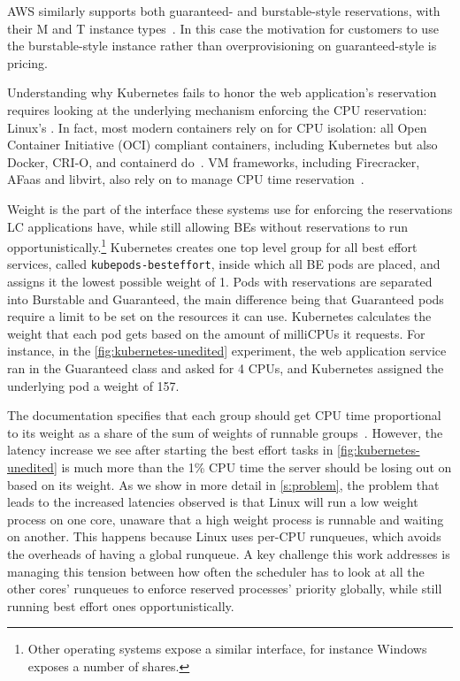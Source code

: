 AWS similarly supports both guaranteed- and burstable-style reservations, with
their M and T instance types~\cite{aws-ec2-burstable,aws-ec2-resources}. In this
case the motivation for customers to use the burstable-style instance rather
than overprovisioning on guaranteed-style is pricing.




Understanding why Kubernetes fails to honor the web application's reservation
requires looking at the underlying mechanism enforcing the CPU reservation:
Linux's \cgroups{}. In fact, most modern containers rely on \cgroups{} for CPU
isolation: all Open Container Initiative (OCI) compliant containers, including
Kubernetes but also Docker, CRI-O, and containerd
do~\cite{oci-cgroups,docker-docs-cgroups,container-isolation-article}. VM
frameworks, including Firecracker, AFaas and libvirt, also rely on \cgroups{} to
manage CPU time reservation~\cite{firecracker-cgroups,afaas,libvirt-cgroups}.

Weight is the part of the \cgroups{} interface these systems use for enforcing
the reservations LC applications have, while still allowing BEs without
reservations to run opportunistically.\footnote{Other operating systems expose a
similar interface, for instance Windows exposes a number of shares.} Kubernetes
creates one top level group for all best effort services, called
\texttt{kubepods-besteffort}, inside which all BE pods are placed, and assigns
it the lowest possible weight of 1. Pods with reservations are separated into
Burstable and Guaranteed, the main difference being that Guaranteed pods require
a limit to be set on the resources it can use. Kubernetes calculates the weight
that each pod gets based on the amount of milliCPUs it requests. For instance,
in the \autoref{fig:kubernetes-unedited} experiment, the web application service
ran in the Guaranteed class and asked for 4 CPUs, and Kubernetes assigned the
underlying pod a weight of 157.

The \cgroups{} documentation specifies that each group should get CPU time
proportional to its weight as a share of the sum of weights of runnable
groups~\cite{cgroups-kerneldocs}. However, the latency increase we see after
starting the best effort tasks in \autoref{fig:kubernetes-unedited} is much more
than the 1\% CPU time the server should be losing out on based on its weight. As
we show in more detail in \autoref{s:problem}, the problem that leads to the
increased latencies observed is that Linux will run a low weight process on one
core, unaware that a high weight process is runnable and waiting on another.
This happens because Linux uses per-CPU runqueues, which avoids the overheads of
having a global runqueue. A key challenge this work addresses is managing this
tension between how often the scheduler has to look at all the other cores'
runqueues to enforce reserved processes' priority globally, while still running
best effort ones opportunistically.

